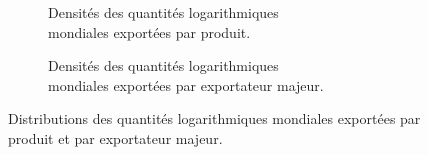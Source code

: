 \begin{figure}[H]
\begin{subfigure}{.5\textwidth}
						\caption{Densités des quantités logarithmiques\\mondiales exportées par produit.}
						\label{fig:densprod}
				\end{subfigure}
				\begin{subfigure}{.5\textwidth}
						\centering
						\caption{Densités des quantités logarithmiques\\mondiales exportées par exportateur majeur.}
						\label{fig:densexp}
				\end{subfigure}
						\caption{Distributions des quantités logarithmiques mondiales exportées par produit et par exportateur majeur.}
						\label{fig:DistProdExp}
		\end{figure}
